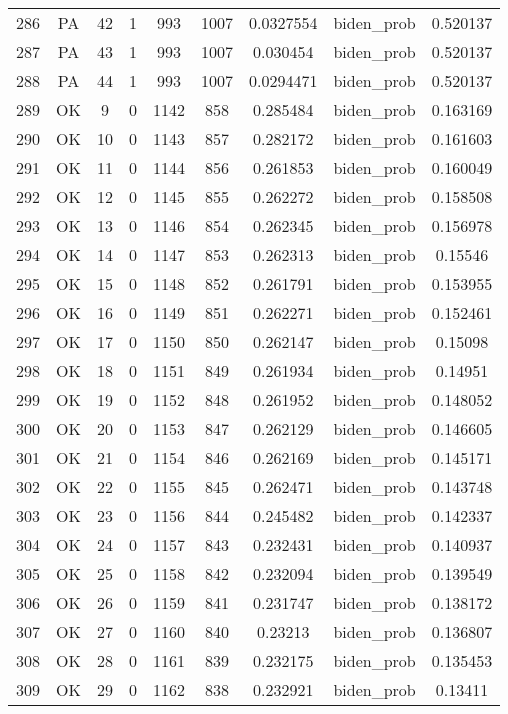\documentclass[12pt,a4paper]{article}
\begin{document}
\begin{tabular}{r|cccccccc}
	286 & PA & 42 & 1 & 993 & 1007 & 0.0327554 & biden\_prob & 0.520137 \\
	287 & PA & 43 & 1 & 993 & 1007 & 0.030454 & biden\_prob & 0.520137 \\
	288 & PA & 44 & 1 & 993 & 1007 & 0.0294471 & biden\_prob & 0.520137 \\
	289 & OK & 9 & 0 & 1142 & 858 & 0.285484 & biden\_prob & 0.163169 \\
	290 & OK & 10 & 0 & 1143 & 857 & 0.282172 & biden\_prob & 0.161603 \\
	291 & OK & 11 & 0 & 1144 & 856 & 0.261853 & biden\_prob & 0.160049 \\
	292 & OK & 12 & 0 & 1145 & 855 & 0.262272 & biden\_prob & 0.158508 \\
	293 & OK & 13 & 0 & 1146 & 854 & 0.262345 & biden\_prob & 0.156978 \\
	294 & OK & 14 & 0 & 1147 & 853 & 0.262313 & biden\_prob & 0.15546 \\
	295 & OK & 15 & 0 & 1148 & 852 & 0.261791 & biden\_prob & 0.153955 \\
	296 & OK & 16 & 0 & 1149 & 851 & 0.262271 & biden\_prob & 0.152461 \\
	297 & OK & 17 & 0 & 1150 & 850 & 0.262147 & biden\_prob & 0.15098 \\
	298 & OK & 18 & 0 & 1151 & 849 & 0.261934 & biden\_prob & 0.14951 \\
	299 & OK & 19 & 0 & 1152 & 848 & 0.261952 & biden\_prob & 0.148052 \\
	300 & OK & 20 & 0 & 1153 & 847 & 0.262129 & biden\_prob & 0.146605 \\
	301 & OK & 21 & 0 & 1154 & 846 & 0.262169 & biden\_prob & 0.145171 \\
	302 & OK & 22 & 0 & 1155 & 845 & 0.262471 & biden\_prob & 0.143748 \\
	303 & OK & 23 & 0 & 1156 & 844 & 0.245482 & biden\_prob & 0.142337 \\
	304 & OK & 24 & 0 & 1157 & 843 & 0.232431 & biden\_prob & 0.140937 \\
	305 & OK & 25 & 0 & 1158 & 842 & 0.232094 & biden\_prob & 0.139549 \\
	306 & OK & 26 & 0 & 1159 & 841 & 0.231747 & biden\_prob & 0.138172 \\
	307 & OK & 27 & 0 & 1160 & 840 & 0.23213 & biden\_prob & 0.136807 \\
	308 & OK & 28 & 0 & 1161 & 839 & 0.232175 & biden\_prob & 0.135453 \\
	309 & OK & 29 & 0 & 1162 & 838 & 0.232921 & biden\_prob & 0.13411 \\

\end{tabular}
\end{document}
